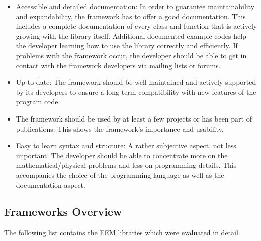 \begin{itemize}
  \item Accessible and detailed documentation: In order to guarantee maintainability and expandability, the framework has to offer a good documentation. This includes a complete documentation of every class and function that is actively growing with the library itself. Additional documented example codes help the developer learning how to use the library correctly and efficiently. If problems with the framework occur, the developer should be able to get in contact with the framework developers via mailing lists or forums.
 
  \item Up-to-date: The framework should be well maintained and actively supported by its developers to ensure a long term compatibility with new features of the program code.
 
  \item The framework should be used by at least a few projects or has been part of publications. This shows the framework's importance and usability.
 
  \item Easy to learn syntax and structure: A rather subjective aspect, not less important. The developer should be able to concentrate more on the mathematical/physical problems and less on programming details. This accompanies the choice of the programming language as well as the documentation aspect.
 \end{itemize}
 
 
 
 \subsection{Frameworks Overview}
 The following list contains the FEM libraries which were evaluated in detail.
  
  
